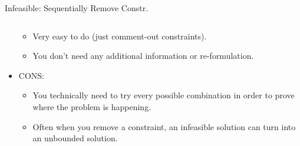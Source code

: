 \documentclass[10pt, aspectratio=169]{beamer}
\begin{document}
\begin{frame}{Infeasible: Sequentially Remove Constr.}
\begin{columns}
\begin{column}{0.5\textwidth}
\begin{itemize}
\begin{itemize}
                    \item Very easy to do (just comment-out constraints).
                    \item You don't need any additional information or re-formulation.
                \end{itemize}
                \item CONS:
                \begin{itemize}
                    \item You technically need to try every possible combination in order to prove where the problem is happening.
                    \item Often when you remove a constraint, an infeasible solution can turn into an unbounded solution.
                \end{itemize}
            \end{itemize}
        \end{column}
    \end{columns}
\end{frame}
\end{document}
